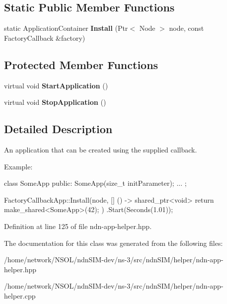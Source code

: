 \subsection*{Static Public Member Functions}
\begin{DoxyCompactItemize}
\item 
static Application\+Container {\bfseries Install} (Ptr$<$ Node $>$ node, const Factory\+Callback \&factory)\hypertarget{classns3_1_1ndn_1_1FactoryCallbackApp_ab5bd03ceabf48911720bf783a8183fe8}{}\label{classns3_1_1ndn_1_1FactoryCallbackApp_ab5bd03ceabf48911720bf783a8183fe8}

\end{DoxyCompactItemize}
\subsection*{Protected Member Functions}
\begin{DoxyCompactItemize}
\item 
virtual void {\bfseries Start\+Application} ()\hypertarget{classns3_1_1ndn_1_1FactoryCallbackApp_a091d8fef2471c1d02325e8f9f202e4e5}{}\label{classns3_1_1ndn_1_1FactoryCallbackApp_a091d8fef2471c1d02325e8f9f202e4e5}

\item 
virtual void {\bfseries Stop\+Application} ()\hypertarget{classns3_1_1ndn_1_1FactoryCallbackApp_a6809c7e6b9b74d7909dd663369b0e6f9}{}\label{classns3_1_1ndn_1_1FactoryCallbackApp_a6809c7e6b9b74d7909dd663369b0e6f9}

\end{DoxyCompactItemize}


\subsection{Detailed Description}
An application that can be created using the supplied callback. 

Example\+: \begin{DoxyVerb}class SomeApp
{
public:
  SomeApp(size_t initParameter);
  ...
};

FactoryCallbackApp::Install(node, [] () -> shared_ptr<void> {
    return make_shared<SomeApp>(42);
  })
  .Start(Seconds(1.01));\end{DoxyVerb}
 

Definition at line 125 of file ndn-\/app-\/helper.\+hpp.



The documentation for this class was generated from the following files\+:\begin{DoxyCompactItemize}
\item 
/home/network/\+N\+S\+O\+L/ndn\+S\+I\+M-\/dev/ns-\/3/src/ndn\+S\+I\+M/helper/ndn-\/app-\/helper.\+hpp\item 
/home/network/\+N\+S\+O\+L/ndn\+S\+I\+M-\/dev/ns-\/3/src/ndn\+S\+I\+M/helper/ndn-\/app-\/helper.\+cpp\end{DoxyCompactItemize}
